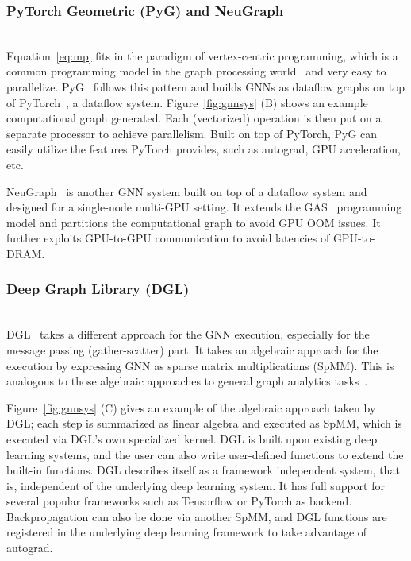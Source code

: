 \subsubsection{PyTorch Geometric (PyG) and NeuGraph} \hfill \\
Equation~\ref{eq:mp} fits in the paradigm of vertex-centric programming, which is a common programming model in the graph processing world~\cite{vertexcentric, powergraph, pregel} and very easy to parallelize. PyG~\cite{pyg} follows this pattern and builds GNNs as dataflow graphs on top of PyTorch~\cite{torch}, a dataflow system. Figure~\ref{fig:gnnsys} (B) shows an example computational graph generated. Each (vectorized) operation is then put on a separate processor to achieve parallelism. Built on top of PyTorch, PyG can easily utilize the features PyTorch provides, such as autograd, GPU acceleration, etc. 

NeuGraph~\cite{neugraph} is another GNN system built on top of a dataflow system and designed for a single-node multi-GPU setting. It extends the GAS~\cite{powergraph} programming model and partitions the computational graph to avoid GPU OOM issues. It further exploits GPU-to-GPU communication to avoid latencies of GPU-to-DRAM. 

\subsubsection{Deep Graph Library (DGL)} \hfill \\
DGL~\cite{dgl} takes a different approach for the GNN execution, especially for the message passing (gather-scatter) part. It takes an algebraic approach for the execution by expressing GNN as sparse matrix multiplications (SpMM). This is analogous to those algebraic approaches to general graph analytics tasks~\cite{graphla}.

Figure~\ref{fig:gnnsys} (C) gives an example of the algebraic approach taken by DGL; each step is summarized as linear algebra and executed as SpMM, which is executed via DGL's own specialized kernel. DGL is built upon existing deep learning systems, and the user can also write user-defined functions to extend the built-in functions. DGL describes itself as a framework independent system, that is, independent of the underlying deep learning system. It has full support for several popular frameworks such as Tensorflow or PyTorch as backend. Backpropagation can also be done via another SpMM, and DGL functions are registered in the underlying deep learning framework to take advantage of autograd.

